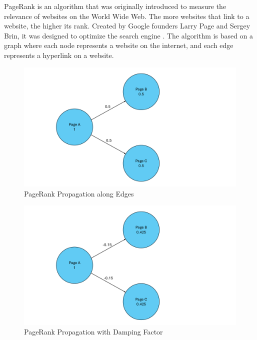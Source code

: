PageRank is an algorithm that was originally introduced to measure the relevance of websites on the World Wide Web. The more websites that link to a website, the higher its rank. Created by Google founders Larry Page and Sergey Brin, it was designed to optimize the search engine \cite{page_pagerank_1999}.
The algorithm is based on a graph where each node represents a website on the internet, and each edge represents a hyperlink on a website.
\begin{figure}[ht]
    \centering
    \includegraphics[width=0.7\linewidth]{images/PageRank_Graph.pdf}
    \caption{PageRank Propagation along Edges}
    \label{fig:pagerank}
\end{figure}
\begin{figure}[ht]
    \centering
    \includegraphics[width=0.7\linewidth]{images/PageRank_Graph_DF.pdf}
    \caption{PageRank Propagation with Damping Factor}
    \label{fig:pagerankdf}
\end{figure}


